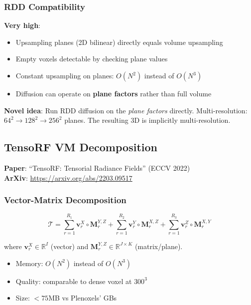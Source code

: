 \documentclass[11pt, a4paper]{article}
\begin{document}
\subsubsection{RDD Compatibility}

\textbf{Very high}:
\begin{itemize}
    \item Upsampling planes (2D bilinear) directly equals volume upsampling
    \item Empty voxels detectable by checking plane values
    \item Constant upsampling on planes: $O(N^2)$ instead of $O(N^3)$
    \item Diffusion can operate on \textbf{plane factors} rather than full volume
\end{itemize}

\textbf{Novel idea}: Run RDD diffusion on the \emph{plane factors} directly. Multi-resolution: $64^2 \to 128^2 \to 256^2$ planes. The resulting 3D is implicitly multi-resolution.

\subsection{TensoRF VM Decomposition}

\textbf{Paper}: ``TensoRF: Tensorial Radiance Fields'' (ECCV 2022)\\
\textbf{ArXiv}: \url{https://arxiv.org/abs/2203.09517}

\subsubsection{Vector-Matrix Decomposition}

\begin{equation}
    \mathcal{T} = \sum_{r=1}^{R_1} \mathbf{v}_r^X \circ \mathbf{M}_r^{Y,Z} + \sum_{r=1}^{R_2} \mathbf{v}_r^Y \circ \mathbf{M}_r^{X,Z} + \sum_{r=1}^{R_3} \mathbf{v}_r^Z \circ \mathbf{M}_r^{X,Y}
\end{equation}

where $\mathbf{v}_r^X \in \mathbb{R}^I$ (vector) and $\mathbf{M}_r^{Y,Z} \in \mathbb{R}^{J \times K}$ (matrix/plane).

\begin{itemize}
    \item Memory: $O(N^2)$ instead of $O(N^3)$
    \item Quality: comparable to dense voxel at $300^3$
    \item Size: $<75$MB vs Plenoxels' GBs
\end{itemize}
\end{document}

